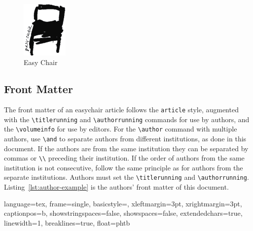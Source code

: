 \documentclass[]{easychair}
\newcommand{\easychair}{\textsf{easychair}}
\begin{document}
\begin{figure}[htp]
	\begin{centering}
	\includegraphics[width=0.2\textwidth]{chairEC}
	\caption{Easy Chair}
	\label{fig:easychair}
	\end{centering}
\end{figure}

\subsection{Front Matter}
\label{sect:front-matter}

The front matter of an {\easychair} article follows the \texttt{article}
style, augmented with the \verb+\titlerunning+ and \verb+\authorrunning+
commands for use by authors, and the \verb+\volumeinfo+ for use by editors.
For the \verb+\author+ command with multiple authors, use \verb+\and+ to
separate authors from different institutions, as done in this document.
If the authors are from the same institution they can be separated
by commas or \verb+\\+ preceding their institution.
If the order of authors from the same institution is not consecutive, follow
the same principle as for authors from the separate institutions.
Authors must set the \verb+\titlerunning+ and \verb+\authorrunning+.
Listing~\ref{lst:author-example} is the authors' front matter of this 
document.


{
	language=tex,
	frame=single,
	basicstyle=\scriptsize,
	xleftmargin=3pt,
	xrightmargin=3pt,
	captionpos=b,
	showstringspaces=false,
	showspaces=false,
	extendedchars=true,
	linewidth=1\linewidth,
	breaklines=true,
	float=phtb
}
\end{document}
